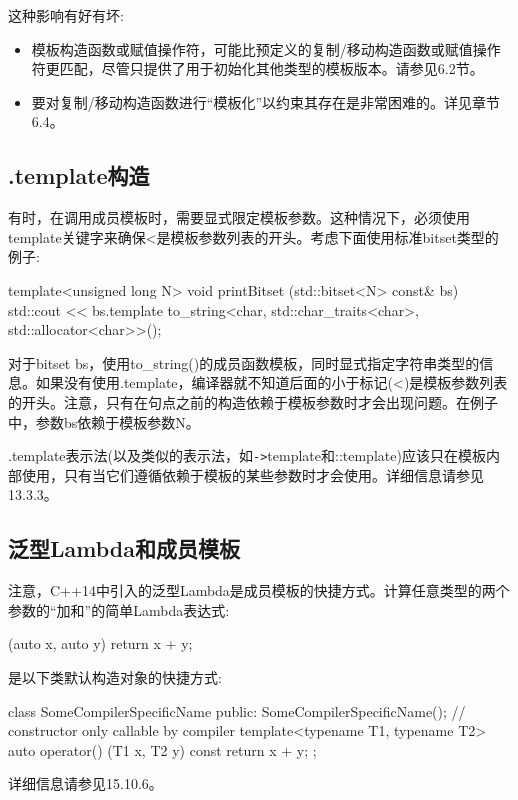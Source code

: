 这种影响有好有坏:

\begin{itemize}
\item 
模板构造函数或赋值操作符，可能比预定义的复制/移动构造函数或赋值操作符更匹配，尽管只提供了用于初始化其他类型的模板版本。请参见6.2节。

\item 
要对复制/移动构造函数进行“模板化”以约束其存在是非常困难的。详见章节6.4。
\end{itemize}

\subsection{.template构造}

有时，在调用成员模板时，需要显式限定模板参数。这种情况下，必须使用template关键字来确保<是模板参数列表的开头。考虑下面使用标准bitset类型的例子:

\begin{cpp}
template<unsigned long N>
void printBitset (std::bitset<N> const& bs) {
	std::cout << bs.template to_string<char, std::char_traits<char>,
			std::allocator<char>>();
}
\end{cpp}

对于bitset bs，使用to\_string()的成员函数模板，同时显式指定字符串类型的信息。如果没有使用.template，编译器就不知道后面的小于标记(<)是模板参数列表的开头。注意，只有在句点之前的构造依赖于模板参数时才会出现问题。在例子中，参数bs依赖于模板参数N。

.template表示法(以及类似的表示法，如\texttt{->}template和::template)应该只在模板内部使用，只有当它们遵循依赖于模板的某些参数时才会使用。详细信息请参见13.3.3。

\subsection{泛型Lambda和成员模板}

注意，C++14中引入的泛型Lambda是成员模板的快捷方式。计算任意类型的两个参数的“加和”的简单Lambda表达式:

\begin{cpp}
[] (auto x, auto y) {
	return x + y;
}
\end{cpp}

是以下类默认构造对象的快捷方式:

\begin{cpp}
class SomeCompilerSpecificName {
	public:
	SomeCompilerSpecificName(); // constructor only callable by compiler
	template<typename T1, typename T2>
	auto operator() (T1 x, T2 y) const {
		return x + y;
	}
};
\end{cpp}

详细信息请参见15.10.6。







